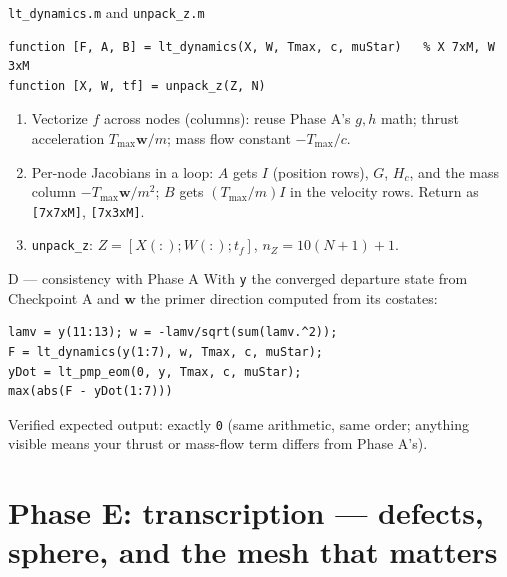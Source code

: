 \documentclass[11pt,letterpaper]{article}
\begin{document}
\begin{exercise}{\texttt{lt\_dynamics.m} and \texttt{unpack\_z.m}}
\begin{verbatim}
function [F, A, B] = lt_dynamics(X, W, Tmax, c, muStar)   % X 7xM, W 3xM
function [X, W, tf] = unpack_z(Z, N)
\end{verbatim}
\begin{enumerate}[leftmargin=1.5em,nosep]
\item Vectorize $f$ across nodes (columns): reuse Phase A's $g, h$ math;
      thrust acceleration $T_{\max}\mathbf w/m$; mass flow constant
      $-T_{\max}/c$.
\item Per-node Jacobians in a loop: $A$ gets $I$ (position rows), $G$,
      $H_c$, and the mass column $-T_{\max}\mathbf w/m^2$; $B$ gets
      $(T_{\max}/m) I$ in the velocity rows. Return as
      \texttt{[7x7xM]}, \texttt{[7x3xM]}.
\item \texttt{unpack\_z}: $Z = [X(:); W(:); t_f]$,
      $n_Z = 10(N{+}1)+1$.
\end{enumerate}
\end{exercise}

\begin{checkpoint}{D --- consistency with Phase A}
With \texttt{y} the converged departure state from Checkpoint A and
$\mathbf w$ the primer direction computed from its costates:
\begin{verbatim}
lamv = y(11:13); w = -lamv/sqrt(sum(lamv.^2));
F = lt_dynamics(y(1:7), w, Tmax, c, muStar);
yDot = lt_pmp_eom(0, y, Tmax, c, muStar);
max(abs(F - yDot(1:7)))
\end{verbatim}
Verified expected output: exactly \texttt{0} (same arithmetic, same
order; anything visible means your thrust or mass-flow term differs from
Phase A's).
\end{checkpoint}

\section{Phase E: transcription --- defects, sphere, and the mesh that matters}
\end{document}
